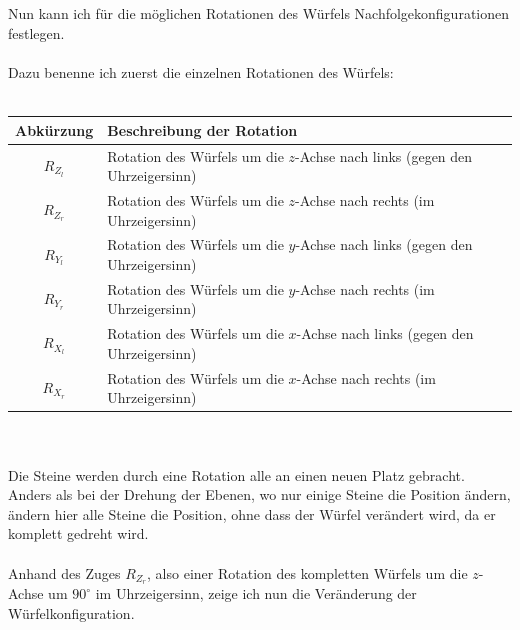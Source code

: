 \documentclass[12pt,a4paper, usenames, dvipsnames]{article}
\begin{document}
\ \\ 
\\
Nun kann ich für die möglichen Rotationen des Würfels Nachfolgekonfigurationen festlegen. \\
\\
Dazu benenne ich zuerst die einzelnen Rotationen des Würfels: \\
\\
\begin{tabular}{|c|l|}
\hline
Abkürzung & Beschreibung der Rotation \\
\hline
\hline
$R_{Z_l}$ & Rotation des Würfels um die $z$-Achse nach links (gegen den Uhrzeigersinn)\\
\hline
$R_{Z_r}$ & Rotation des Würfels um die $z$-Achse nach rechts (im Uhrzeigersinn)  \\
\hline
$R_{Y_l}$ & Rotation des Würfels um die $y$-Achse nach links (gegen den Uhrzeigersinn)\\
\hline
$R_{Y_r}$ & Rotation des Würfels um die $y$-Achse nach rechts (im Uhrzeigersinn)  \\
\hline
$R_{X_l}$ & Rotation des Würfels um die $x$-Achse nach links (gegen den Uhrzeigersinn)\\
\hline
$R_{X_r}$ & Rotation des Würfels um die $x$-Achse nach rechts (im Uhrzeigersinn) \\
\hline
\end{tabular} \\
\\
Die Steine werden durch eine Rotation alle an einen neuen Platz gebracht. Anders als bei der Drehung der Ebenen, wo nur einige Steine die Position ändern, ändern hier alle Steine die Position, ohne dass der Würfel verändert wird, da er komplett gedreht wird. \\
\\
Anhand des Zuges $R_{Z_r}$, also einer Rotation des kompletten Würfels um die $z$-Achse um $90^\circ$ im Uhrzeigersinn, zeige ich nun die Veränderung der Würfelkonfiguration. 
\end{document}
